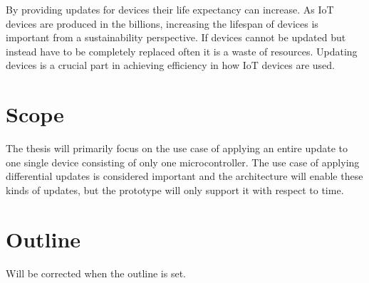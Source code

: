 \documentclass[0-thesis.tex]{subfiles}
\begin{document}
By providing updates for devices their life expectancy can increase. As IoT devices are
produced in the billions, increasing the lifespan of devices is important from a
sustainability perspective. If devices cannot be updated but instead have to be completely
replaced often it is a waste of resources. Updating devices is a crucial part in achieving
efficiency in how IoT devices are used.

\section{Scope}
The thesis will primarily focus on the use case of applying an entire update to one single
device consisting of only one microcontroller. The use case of applying differential
updates is considered important and the architecture will enable these kinds of updates,
but the prototype will only support it with respect to time. 

\section{Outline}
Will be corrected when the outline is set.
\end{document}
